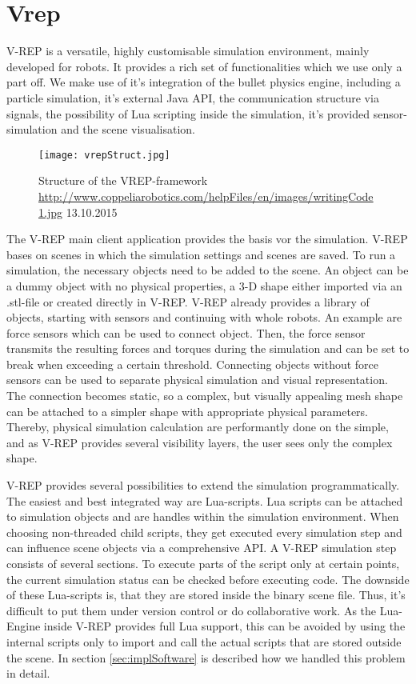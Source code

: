 \section{Vrep}
\label{sec:theoryVrep}
V-REP is a versatile, highly customisable simulation environment, mainly developed for robots. It provides a rich set of functionalities which we use only a part off.  We make use of it's integration of the bullet physics engine, including a particle simulation, it's external Java API, the communication structure via signals, the possibility of Lua scripting inside the simulation, it's provided sensor-simulation and the scene visualisation.
\begin{figure}[h!]
 \begin{center}
  \texttt{[image: vrepStruct.jpg]}
 \end{center}
  \caption{Structure of the VREP-framework \url{http://www.coppeliarobotics.com/helpFiles/en/images/writingCode1.jpg} 13.10.2015 \label{fig:vrepStruct}}
\end{figure}

The V-REP main client application provides the basis vor the simulation. V-REP bases on scenes in which the simulation settings and scenes are saved. To run a simulation, the necessary objects need to be added to the scene. An object can be a dummy object with no physical properties, a 3-D shape either imported via an .stl-file or created directly in V-REP. V-REP already provides a library of objects, starting with sensors and continuing with whole robots. An example are force sensors which can be used to connect object. Then, the force sensor transmits the resulting forces and torques during the simulation and can be set to break when exceeding a certain threshold. Connecting objects without force sensors can be used to separate physical simulation and visual representation. The connection becomes static, so a complex, but visually appealing mesh shape can be attached to a simpler shape with appropriate physical parameters. Thereby, physical simulation calculation are performantly done on the simple, and as V-REP provides several visibility layers, the user sees only the complex shape.

V-REP provides several possibilities to extend the simulation programmatically. The easiest and best integrated way are Lua-scripts. Lua scripts can be attached to simulation objects and are handles within the simulation environment. When choosing non-threaded child scripts, they get executed every simulation step and can influence scene objects via a comprehensive API. A V-REP simulation step consists of several sections. To execute parts of the script only at certain points, the current simulation status can be checked before executing code.  The downside of these Lua-scripts is, that they are stored inside the binary scene file. Thus, it's difficult to put them under version control or do collaborative work. As the Lua-Engine inside V-REP provides full Lua support, this can be avoided by using the internal scripts only to import and call the actual scripts that are stored outside the scene. In section \ref{sec:implSoftware} is described how we handled this problem in detail.

